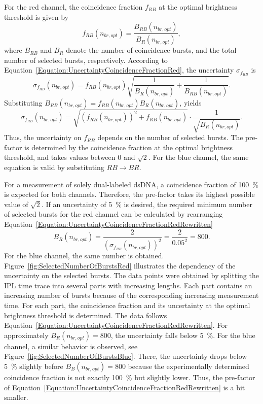 For the red channel, the coincidence fraction $f_{RB}$ at the optimal brightness threshold is given by
\begin{equation}
	f_{RB} (n_{br,opt}) = \frac{B_{RB}(n_{br,opt})}{B_R(n_{br,opt})},
\end{equation}
where $B_{RB}$ and $B_R$ denote the number of coincidence bursts, and the total number of selected bursts, respectively. According to Equation~\eqref{Equation:UncertaintyCoincidenceFractionRed}, the uncertainty $\sigma_{f_{RB}}$ is
\begin{equation}
	\sigma_{f_{RB}}(n_{br,opt}) = f_{RB}(n_{br,opt}) \sqrt{\frac{1}{B_R(n_{br,opt})} + \frac{1}{B_{RB}(n_{br,opt})}}.
\end{equation}
Substituting $B_{RB}(n_{br,opt}) = f_{RB}(n_{br,opt}) B_R(n_{br,opt})$, yields
\begin{equation} \label{Equation:UncertaintyCoincidenceFractionRedRewritten}
	\sigma_{f_{RB}}(n_{br,opt}) = \sqrt{\left(f_{RB}(n_{br,opt})\right)^2 + f_{RB}(n_{br,opt})} \cdot \frac{1}{\sqrt{B_R(n_{br,opt})}}.
\end{equation}
Thus, the uncertainty on $f_{RB}$ depends on the number of selected bursts. The pre-factor is determined by the coincidence fraction at the optimal brightness threshold, and takes values between \num{0} and $\sqrt{2}$. For the blue channel, the same equation is valid by substituting $RB \rightarrow BR$.

\clearpage

For a measurement of solely dual-labeled \gls{dsDNA}, a coincidence fraction of \SI{100}{\percent} is expected for both channels. Therefore, the pre-factor takes its highest possible value of $\sqrt{2}$. If an uncertainty of \SI{5}{\percent} is desired, the required minimum number of selected bursts for the red channel can be calculated by rearranging Equation~\eqref{Equation:UncertaintyCoincidenceFractionRedRewritten}
\begin{equation}
	B_R(n_{br,opt}) = \frac{2}{\left(\sigma_{f_{RB}}(n_{br,opt})\right)^2} = \frac{2}{0.05^2} = 800.
\end{equation}
For the blue channel, the same number is obtained.\\

Figure~\ref{fig:SelectedNumberOfBurstsRed} illustrates the dependency of the uncertainty on the selected bursts. The data points were obtained by splitting the \gls{IPL} time trace into several parts with increasing lengths. Each part contains an increasing number of bursts because of the corresponding increasing measurement time. For each part, the coincidence fraction and its uncertainty at the optimal brightness threshold is determined. The data follows Equation~\eqref{Equation:UncertaintyCoincidenceFractionRedRewritten}. For approximately $B_R(n_{br,opt}) = 800$, the uncertainty falls below \SI{5}{\percent}. For the blue channel, a similar behavior is observed, see Figure~\ref{fig:SelectedNumberOfBurstsBlue}. There, the uncertainty drops below \SI{5}{\percent} slightly before $B_B(n_{br,opt}) = 800$ because the experimentally determined coincidence fraction is not exactly \SI{100}{\percent} but slightly lower. Thus, the pre-factor of Equation~\eqref{Equation:UncertaintyCoincidenceFractionRedRewritten} is a bit smaller.

